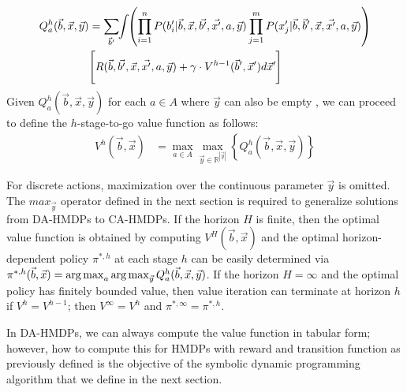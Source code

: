 \documentclass[twoside,11pt]{article}
\def\argmax{\operatornamewithlimits{arg\max}}
\begin{document}
\vspace{-4mm}
{%
\begin{align}
Q_a^{h}(\vec{b},\vec{x},\vec{y}) & = 
 \sum_{\vec{b}'} \hspace{-1.0mm} \int \hspace{-1.0mm} \left( \prod_{i=1}^n P(b_i'|\vec{b},\vec{x},\vec{b'},\vec{x'},a,\vec{y}) \prod_{j=1}^m P(x_j'|\vec{b},\vec{b}',\vec{x},\vec{x'},a,\vec{y}) \right) \label{eq:qfun} \\ 
& \Bigg[ R(\vec{b},\vec{b'},\vec{x},\vec{x'}, a,\vec{y}) + \gamma \cdot V^{h-1}(\vec{b}',\vec{x}') d\vec{x}'  \hspace{-0.2mm} \Bigg] \nonumber
\end{align}}
Given $Q_a^h(\vec{b},\vec{x},\vec{y})$ for each $a \in A$ where $\vec{y}$ can also be empty , we can proceed
to define the $h$-stage-to-go value function as follows:
\begin{align}
V^{h}(\vec{b},\vec{x}) & = \max_{a \in A} \max_{\vec{y} \in \mathbb{R}^{|\vec{y}|}} \left\{ Q^{h}_a(\vec{b},\vec{x},\vec{y}) \right\} \label{eq:vfun}
\end{align}

For discrete actions, maximization over the continuous parameter $\vec{y}$ is omitted. The $max_{\vec{y}}$ operator defined in the next section is required to generalize solutions from DA-HMDPs to CA-HMDPs.
If the horizon $H$ is finite, then the optimal value function is
obtained by computing $V^H(\vec{b},\vec{x})$ and the optimal
horizon-dependent policy $\pi^{*,h}$ at each stage $h$ can be easily
determined via $\pi^{*,h}(\vec{b},\vec{x}) = \argmax_a
\argmax_{\vec{y}} Q^h_a(\vec{b},\vec{x},\vec{y})$.  If the horizon $H
= \infty$ and the optimal policy has finitely bounded value, then
value iteration can terminate at horizon $h$ if $V^{h} = V^{h-1}$;
then $V^\infty = V^h$ and $\pi^{*,\infty} = \pi^{*,h}$.

In DA-HMDPs, we can always compute the value function in tabular form;
however, how to compute this for HMDPs with reward and transition
function as previously defined is the objective of the symbolic
dynamic programming algorithm that we define in the next section.
\end{document}
